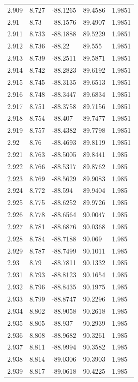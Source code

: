 \begin{tabular}{lllll}
2.909 & 8.727 & -88.1265 & 89.4586 & 1.9851 \\
2.91 & 8.73 & -88.1576 & 89.4907 & 1.9851 \\
2.911 & 8.733 & -88.1888 & 89.5229 & 1.9851 \\
2.912 & 8.736 & -88.22 & 89.555 & 1.9851 \\
2.913 & 8.739 & -88.2511 & 89.5871 & 1.9851 \\
2.914 & 8.742 & -88.2823 & 89.6192 & 1.9851 \\
2.915 & 8.745 & -88.3135 & 89.6513 & 1.9851 \\
2.916 & 8.748 & -88.3447 & 89.6834 & 1.9851 \\
2.917 & 8.751 & -88.3758 & 89.7156 & 1.9851 \\
2.918 & 8.754 & -88.407 & 89.7477 & 1.9851 \\
2.919 & 8.757 & -88.4382 & 89.7798 & 1.9851 \\
2.92 & 8.76 & -88.4693 & 89.8119 & 1.9851 \\
2.921 & 8.763 & -88.5005 & 89.8441 & 1.985 \\
2.922 & 8.766 & -88.5317 & 89.8762 & 1.985 \\
2.923 & 8.769 & -88.5629 & 89.9083 & 1.985 \\
2.924 & 8.772 & -88.594 & 89.9404 & 1.985 \\
2.925 & 8.775 & -88.6252 & 89.9726 & 1.985 \\
2.926 & 8.778 & -88.6564 & 90.0047 & 1.985 \\
2.927 & 8.781 & -88.6876 & 90.0368 & 1.985 \\
2.928 & 8.784 & -88.7188 & 90.069 & 1.985 \\
2.929 & 8.787 & -88.7499 & 90.1011 & 1.985 \\
2.93 & 8.79 & -88.7811 & 90.1332 & 1.985 \\
2.931 & 8.793 & -88.8123 & 90.1654 & 1.985 \\
2.932 & 8.796 & -88.8435 & 90.1975 & 1.985 \\
2.933 & 8.799 & -88.8747 & 90.2296 & 1.985 \\
2.934 & 8.802 & -88.9058 & 90.2618 & 1.985 \\
2.935 & 8.805 & -88.937 & 90.2939 & 1.985 \\
2.936 & 8.808 & -88.9682 & 90.3261 & 1.985 \\
2.937 & 8.811 & -88.9994 & 90.3582 & 1.985 \\
2.938 & 8.814 & -89.0306 & 90.3903 & 1.985 \\
2.939 & 8.817 & -89.0618 & 90.4225 & 1.985 \\

\end{tabular}

